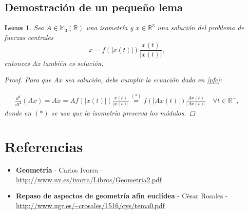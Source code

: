 \documentclass[11pt]{article}
\newtheorem{lema}{Lema}[section]
\theoremstyle{definition}
\begin{document}
    \subsection {Demostración de un pequeño lema}
    \begin{lema} Sea $A \in \mathbb{M}_{3} \left( \mathbb{R} \right)$ una isometría y  $x\in \mathbb{R}^3$ una solución del problema de fuerzas centrales \begin{equation}\ddot{x}=f(|x(t)|)\frac{x(t)}{|x(t)|}, \label{pfc}\end{equation} entonces Ax también es solución.
    \begin{proof}
    Para que $Ax$ sea solución, debe cumplir la ecuación dada en \ref{pfc}:

    \begin{align*}
	\frac{d^2}{dt^2}\left( Ax \right)=A\ddot{x}=Af(|x(t)|)\frac{x(t)}{|x(t)|}\stackrel{(*)}{=}f(|Ax(t)|)\frac{Ax(t)}{|Ax(t)|} \quad \forall t\in \mathbb{R}^{+},
    \end{align*}
    donde en $(*)$ se usa que la isometría preserva los módulos.

    \end{proof}
\end{lema}

\section{Referencias}

\begin{itemize}
\item\textbf{Geometría} - Carlos Ivorra - \url{http://www.uv.es/ivorra/Libros/Geometria2.pdf}
\item\textbf{Repaso de aspectos de geometría afín euclídea} - César Rosales - \url{http://www.ugr.es/~crosales/1516/cys/tema0.pdf}
\end{itemize}
\end{document}
